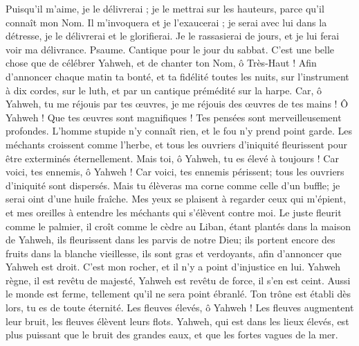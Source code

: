 \begin{multicols}{2}
Puisqu'il m'aime, je le délivrerai ; je le mettrai sur les hauteurs, parce qu'il connaît mon Nom.
Il m'invoquera et je l'exaucerai ; je serai avec lui dans la détresse, je le délivrerai et le glorifierai.
Je le rassasierai de jours, et je lui ferai voir ma délivrance.
\VerseOne{}Psaume. Cantique pour le jour du sabbat.
C'est une belle chose que de célébrer Yahweh, et de chanter ton Nom, ô Très-Haut !
Afin d'annoncer chaque matin ta bonté, et ta fidélité toutes les nuits,
sur l'instrument à dix cordes, sur le luth, et par un cantique prémédité sur la harpe.
Car, ô Yahweh, tu me réjouis par tes œuvres, je me réjouis des œuvres de tes mains !
Ô Yahweh ! Que tes œuvres sont magnifiques ! Tes pensées sont merveilleusement profondes.
L'homme stupide n'y connaît rien, et le fou n'y prend point garde.
Les méchants croissent comme l'herbe, et tous les ouvriers d'iniquité fleurissent pour être exterminés éternellement.
Mais toi, ô Yahweh, tu es élevé à toujours !
Car voici, tes ennemis, ô Yahweh ! Car voici, tes ennemis périssent; tous les ouvriers d'iniquité sont dispersés.
Mais tu élèveras ma corne comme celle d'un buffle; je serai oint d'une huile fraîche.
Mes yeux se plaisent à regarder ceux qui m'épient, et mes oreilles à entendre les méchants qui s'élèvent contre moi.
Le juste fleurit comme le palmier, il croît comme le cèdre au Liban,
étant plantés dans la maison de Yahweh, ils fleurissent dans les parvis de notre Dieu;
ils portent encore des fruits dans la blanche vieillesse, ils sont gras et verdoyants,
afin d'annoncer que Yahweh est droit. C'est mon rocher, et il n'y a point d'injustice en lui.
\VerseOne{}Yahweh règne, il est revêtu de majesté, Yahweh est revêtu de force, il s'en est ceint. Aussi le monde est ferme, tellement qu'il ne sera point ébranlé.
Ton trône est établi dès lors, tu es de toute éternité.
Les fleuves élevés, ô Yahweh ! Les fleuves augmentent leur bruit, les fleuves élèvent leurs flots.
Yahweh, qui est dans les lieux élevés, est plus puissant que le bruit des grandes eaux, et que les fortes vagues de la mer.

\end{multicols}
